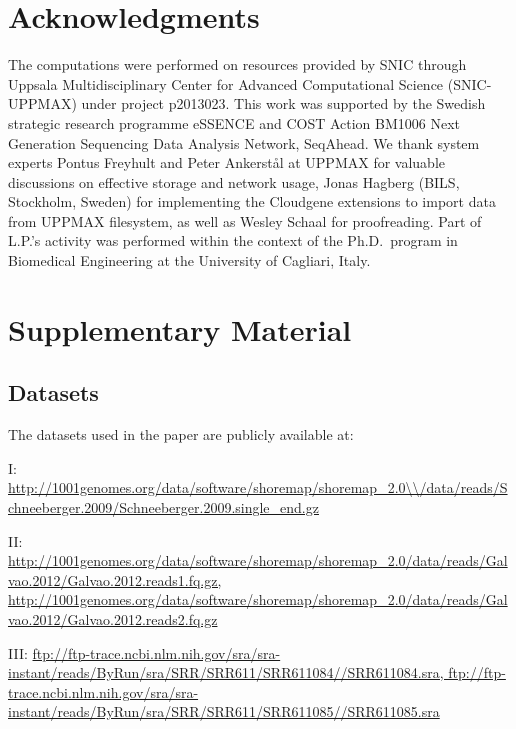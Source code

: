 \documentclass[10pt]{article}
\begin{document}
\section*{Acknowledgments}
The computations were performed on resources provided by SNIC through Uppsala Multidisciplinary Center for Advanced Computational Science (SNIC-UPPMAX) under project p2013023. This work was supported by the Swedish strategic research programme eSSENCE and COST Action BM1006 Next Generation Sequencing Data Analysis Network, SeqAhead.
We thank system experts Pontus Freyhult and Peter Ankerst{\aa}l at UPPMAX for valuable discussions on effective storage and network usage, Jonas Hagberg (BILS, Stockholm, Sweden) for implementing the Cloudgene extensions to import data from UPPMAX filesystem, as well as Wesley Schaal for proofreading.
Part of L.P.'s activity was performed within the context of the Ph.D.\ program in
Biomedical Engineering at the University of Cagliari, Italy.





\section*{Supplementary Material}

\subsection*{Datasets}

The datasets used in the paper are publicly available at:

I: \url{http://1001genomes.org/data/software/shoremap/shoremap\_2.0\\/data/reads/Schneeberger.2009/Schneeberger.2009.single\_end.gz}

II: \url{http://1001genomes.org/data/software/shoremap/shoremap\_2.0/data/reads/Galvao.2012/Galvao.2012.reads1.fq.gz, http://1001genomes.org/data/software/shoremap/shoremap\_2.0/data/reads/Galvao.2012/Galvao.2012.reads2.fq.gz}	

III: \url{ftp://ftp-trace.ncbi.nlm.nih.gov/sra/sra-instant/reads/ByRun/sra/SRR/SRR611/SRR611084//SRR611084.sra, ftp://ftp-trace.ncbi.nlm.nih.gov/sra/sra-instant/reads/ByRun/sra/SRR/SRR611/SRR611085//SRR611085.sra}
\end{document}
